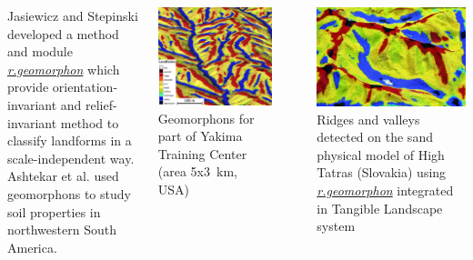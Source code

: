 \documentclass[25pt, margin=0mm, innermargin=15mm, blockverticalspace=15mm, colspace=15mm, subcolspace=8mm]{tikzposter}
\newcommand{\gamodule}[1]{\href{http://grass.osgeo.org/grass70/manuals/addons/#1.html}{\emph{#1}}}
\begin{document}
\begin{columns}
{Jasiewicz and Stepinski \cite{jasiewicz2013geomorphons} developed a method and module \gamodule{r.geomorphon}
which provide orientation-invariant and relief-invariant method to classify landforms
in a scale-independent way.
Ashtekar et al. \cite{ashtekar2014digital} used geomorphons to study soil properties in northwestern South America.

\begin{minipage}{0.5\linewidth}
\includegraphics[width=\textwidth]{geomorphon}
Geomorphons for part of Yakima Training Center (area 5x3~km, USA)
\end{minipage}
~
\begin{minipage}{0.5\linewidth}
\includegraphics[width=\textwidth]{geomorphon_tangible_high_tatras}
Ridges and valleys detected on the sand physical model of High Tatras (Slovakia) using \gamodule{r.geomorphon} integrated in Tangible Landscape system
\end{minipage}
}



\end{columns}
\end{document}
